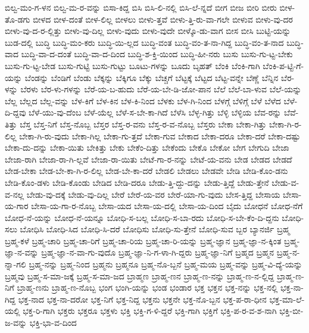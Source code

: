{ಬಿಲ್ವ-ಮಂ-ಗ-ಳನ
ಬಿಲ್ವ-ಮ-ರ-ವನ್ನು
ಬಿಸಾ-ಕಿದ್ದ
ಬಿಸಿ
ಬಿಸಿ-ಲಿ-ನಲ್ಲಿ
ಬಿಸಿ-ಲೆ-ನ್ನದೆ
ಬೀಗ
ಬೀಜ
ಬೀರಿ
ಬೀರು
ಬೀಳ-ತೊ-ಡಗು
ಬೀಳದ
ಬೀಳ-ದಂತೆ
ಬೀಳ-ಲಿಲ್ಲ
ಬೀಳಲು
ಬೀಳು-ತ್ತವೆ
ಬೀಳು-ತ್ತಿ-ರು-ವಾ-ಗಲೇ
ಬೀಳುವ
ಬೀಳು-ವು-ದರ
ಬೀಳು-ವು-ದ-ರ-ಲ್ಲಿತ್ತು
ಬೀಳು-ವು-ದಿಲ್ಲ
ಬೀಳು-ವುದು
ಬೀಳು-ವುದೇ
ಬೀಳ್ಕೊ-ಡು-ವಾಗ
ಬೀಸ
ಬೀಸಿ
ಬುಟ್ಟಿ-ಯನ್ನು
ಬುಡ-ದಲ್ಲಿ
ಬುದ್ಧಿ
ಬುದ್ಧಿ-ಮಂ-ಕರು
ಬುದ್ಧಿ-ಯಿ-ಲ್ಲದ
ಬುದ್ಧಿ-ವಂತ
ಬುದ್ಧಿ-ವಂ-ತ-ನಾ-ಗಿದ್ದ
ಬುದ್ಧಿ-ವಂ-ತ-ನಾದ
ಬುದ್ಧಿ-ವಾದ
ಬುದ್ಧಿ-ವಾ-ದ-ದಂತೆ
ಬುದ್ಧಿ-ವಾ-ದ-ದಿಂದ
ಬುದ್ಧಿ-ಶ-ಕ್ತಿ-ಯಿಂದ
ಬುದ್ಧಿ-ಹೀ-ನರು
ಬುಸು
ಬುಸು-ಗು-ಟ್ಟ-ಬೇಕು
ಬುಸು-ಗು-ಟ್ಟ-ಬೇಡ
ಬುಸು-ಗುಟ್ಟಿ
ಬುಸು-ಗುಟ್ಟು
ಬೂಟು-ಗಳನ್ನು
ಬೂದು
ಬೃಹತ್
ಬೆಂಕಿ
ಬೆಂಕಿ-ಗಾಗಿ
ಬೆಂಕಿ-ಪ-ಟ್ಟಿ-ಗೆ-ಯನ್ನು
ಬೆಂಡನ್ನು
ಬೆಂಡಿಗೆ
ಬೆಂಡು
ಬೆಕ್ಕನ್ನು
ಬೆಕ್ಕಿಗೂ
ಬೆಕ್ಕು
ಬೆಚ್ಚಗೆ
ಬೆಟ್ಟಕ್ಕೆ
ಬೆಟ್ಟದ
ಬೆಟ್ಟ-ವನ್ನೇ
ಬೆಣ್ಣೆ
ಬೆನ್ನಿನ
ಬೆರ-ಳನ್ನು
ಬೆರಳು
ಬೆರ-ಳು-ಗಳನ್ನು
ಬೆರೆ-ಯ-ಬ-ಹುದು
ಬೆರೆ-ಯ-ಬೇ-ಡಿ-ಜೋ-ಪಾನ
ಬೆಲೆ
ಬೆಲೆ-ಬಾ-ಳುವ
ಬೆಲೆ-ಯನ್ನು
ಬೆಲ್ಲ
ಬೆಲ್ಲದ
ಬೆಲ್ಲ-ವನ್ನು
ಬೆಳ-ಕಿಗೆ
ಬೆಳ-ಕಿನ
ಬೆಳ-ಕಿ-ನಿಂದ
ಬೆಳಕು
ಬೆಳ-ಗಿ-ನಿಂದ
ಬೆಳಗ್ಗೆ
ಬೆಳಿಗ್ಗೆ
ಬೆಳೆ
ಬೆಳೆದ
ಬೆಳೆ-ದಿ-ದ್ದವು
ಬೆಳೆ-ಯು-ವು-ದೆಂಬ
ಬೆಳೆ-ಯೆಲ್ಲ
ಬೆಳೆ-ಸ-ಬೇ-ಕಾ-ಗಿದೆ
ಬೆಳೆಸಿ
ಬೆಳ್ಳ-ಗಿತ್ತು
ಬೆಳ್ಳಿ
ಬೆಳ್ಳಿಯ
ಬೆವ-ರನ್ನು
ಬೆವೆ-ತಿತ್ತು
ಬೆಸ್ತ
ಬೆಸ್ತ-ನಿಗೆ
ಬೆಸ್ತ-ನೊಬ್ಬ
ಬೆಸ್ತರ
ಬೆಸ್ತ-ರ-ವನು
ಬೆಸ್ತ-ರ-ವ-ನೊಬ್ಬ
ಬೆಸ್ತರು
ಬೇಕಾ
ಬೇಕಾ-ಗಿತ್ತು
ಬೇಕಾ-ಗಿ-ರ-ಲಿಲ್ಲ
ಬೇಕಾ-ಗಿ-ರು-ವುದು
ಬೇಕಾ-ಗಿಲ್ಲ
ಬೇಕಾ-ಗು-ತ್ತದೆ
ಬೇಕಾ-ಗುವ
ಬೇಕಾದ
ಬೇಕಾ-ದರೂ
ಬೇಕಾ-ದರೆ
ಬೇಕಾ-ದಷ್ಟು
ಬೇಕಾ-ದು-ದನ್ನು
ಬೇಕಾ-ಯಿತು
ಬೇಕಿತ್ತು
ಬೇಕು
ಬೇಕೆಂ-ದಿತ್ತು
ಬೇಕೆಂದು
ಬೇಕೊ
ಬೇಕೋ
ಬೇಗ
ಬೇಗುದಿ
ಬೇಜಾ
ಬೇಜಾ-ರಾಗಿ
ಬೇಜಾ-ರಾ-ಗಿ-ಲ್ಲವೆ
ಬೇಜಾ-ರಾ-ಯಿತು
ಬೇಟೆ-ಗಾ-ರ-ನನ್ನು
ಬೇಟೆ-ಯ-ವನು
ಬೇಡ
ಬೇಡದ
ಬೇಡದೆ
ಬೇಡ-ಬೇಕಾ
ಬೇಡ-ಬೇ-ಕಾ-ಗಿ-ರ-ಲಿಲ್ಲ
ಬೇಡ-ಬೇ-ಕಾ-ದರೆ
ಬೇಡಲಿ
ಬೇಡಲು
ಬೇಡವೇ
ಬೇಡಿ
ಬೇಡಿ-ಕೊಂ-ಡನು
ಬೇಡಿ-ಕೊಂ-ಡಳು
ಬೇಡಿ-ಕೊಂಡು
ಬೇಡಿದ
ಬೇಡಿ-ದರೂ
ಬೇಡು-ತ್ತಿ-ದ್ದು-ದನ್ನು
ಬೇಡು-ತ್ತಿದ್ದೆ
ಬೇಡು-ತ್ತೇನೆ
ಬೇಡು-ವ-ವ-ನಲ್ಲ
ಬೇಡು-ವು-ದಕ್ಕೆ
ಬೇಡು-ವು-ದಿಲ್ಲ
ಬೇರೆ
ಬೇರೆ-ಯ-ವರ
ಬೇರೆ-ಯಾ-ಗು-ವುದು
ಬೇಸ-ತ್ತಿದ್ದ
ಬೇಸಾಯ
ಬೇಸಾ-ಯ-ಗಾರ
ಬೇಸಾ-ಯ-ಗಾ-ರ-ನೊಬ್ಬ
ಬೇಸಾ-ಯದ
ಬೇಸಾ-ಯ-ದಲ್ಲಿ
ಬೇಸಾ-ಯ-ದಿಂದ
ಬೈದು
ಬೋಧನೆ
ಬೋಧ-ನೆಗೆ
ಬೋಧ-ನೆ-ಯನ್ನು
ಬೋಧ-ನೆ-ಯನ್ನೂ
ಬೋಧಿ-ಸ-ಬಲ್ಲ
ಬೋಧಿ-ಸ-ಬಾ-ರದು
ಬೋಧಿ-ಸ-ಬೇ-ಕೆಂ-ದಿ-ದ್ದನು
ಬೋಧಿ-ಸಲು
ಬೋಧಿಸಿ
ಬೋಧಿ-ಸಿದ
ಬೋಧಿ-ಸಿ-ದರೆ
ಬೋಧಿಸು
ಬೋಧಿ-ಸು-ತ್ತೇನೆ
ಬೋಧಿ-ಸುವ
ಬ್ಬರ
ಬ್ಯಾನರ್ಜಿ
ಬ್ರಹ್ಮ
ಬ್ರಹ್ಮ-ಕಳೆ
ಬ್ರಹ್ಮ-ಚಾರಿ
ಬ್ರಹ್ಮ-ಚಾ-ರಿಗೆ
ಬ್ರಹ್ಮ-ಚಾ-ರಿಯ
ಬ್ರಹ್ಮ-ಚಾ-ರಿ-ಯನ್ನು
ಬ್ರಹ್ಮ-ಜ್ಞಾನ
ಬ್ರಹ್ಮ-ಜ್ಞಾ-ನ-ಕ್ಕಿಂತ
ಬ್ರಹ್ಮ-ಜ್ಞಾ-ನ-ವನ್ನು
ಬ್ರಹ್ಮ-ಜ್ಞಾ-ನ-ವಾ-ಗು-ವುದೊ
ಬ್ರಹ್ಮ-ಜ್ಞಾ-ನಿ-ಗ-ಳಾ-ಗಿ-ದ್ದರು
ಬ್ರಹ್ಮ-ಜ್ಞಾ-ನಿಗೆ
ಬ್ರಹ್ಮದ
ಬ್ರಹ್ಮನ
ಬ್ರಹ್ಮ-ನ-ನ್ನಾ-ಗಲಿ
ಬ್ರಹ್ಮ-ನನ್ನು
ಬ್ರಹ್ಮ-ನಿಂದ
ಬ್ರಹ್ಮನು
ಬ್ರಹ್ಮನೂ
ಬ್ರಹ್ಮ-ನೊ-ಬ್ಬನೆ
ಬ್ರಹ್ಮ-ಮಯ
ಬ್ರಹ್ಮ-ವನ್ನು
ಬ್ರಹ್ಮ-ವಿ-ದ್ಯೆ-ಯನ್ನು
ಬ್ರಹ್ಮವು
ಬ್ರಹ್ಮ-ಸ-ಮಾ-ಜಕ್ಕೆ
ಬ್ರಹ್ಮ-ಸ-ಮಾ-ಜದ
ಬ್ರಾಹ್ಮಣ
ಬ್ರಾಹ್ಮ-ಣನ
ಬ್ರಾಹ್ಮ-ಣ-ನನ್ನು
ಬ್ರಾಹ್ಮ-ಣ-ನ-ಲ್ಲಿದ್ದ
ಬ್ರಾಹ್ಮ-ಣ-ನಿಗೆ
ಬ್ರಾಹ್ಮ-ಣನು
ಬ್ರಾಹ್ಮ-ಣ-ನೊಬ್ಬ
ಭಂಗ
ಭಂಗಿ-ಯನ್ನು
ಭಂಡ
ಭಂಡಾರ
ಭಕ್ತ
ಭಕ್ತನ
ಭಕ್ತ-ನನ್ನು
ಭಕ್ತ-ನಲ್ಲಿ
ಭಕ್ತ-ನಾ-ಗಿದ್ದ
ಭಕ್ತ-ನಾದ
ಭಕ್ತ-ನಾ-ದರೋ
ಭಕ್ತ-ನಿಗೆ
ಭಕ್ತ-ನಿದ್ದ
ಭಕ್ತನು
ಭಕ್ತನೇ
ಭಕ್ತ-ನೊ-ಬ್ಬನ
ಭಕ್ತ-ಪ-ರಾ-ಧೀನ
ಭಕ್ತ-ಮಾ-ಲೆ-ಯಲ್ಲಿ
ಭಕ್ತ-ರಿ-ಗಾಗಿ
ಭಕ್ತರು
ಭಕ್ತರೂ
ಭಕ್ತಳು
ಭಕ್ತಿ
ಭಕ್ತಿ-ಗ-ಳಿ-ದ್ದರೆ
ಭಕ್ತಿ-ಗಾಗಿ
ಭಕ್ತಿಗೆ
ಭಕ್ತಿ-ಪ-ರ-ವ-ಶ-ನಾಗಿ
ಭಕ್ತಿ-ಬೀ-ಜ-ವನ್ನು
ಭಕ್ತಿ-ಭಾ-ವ-ದಿಂದ
}
